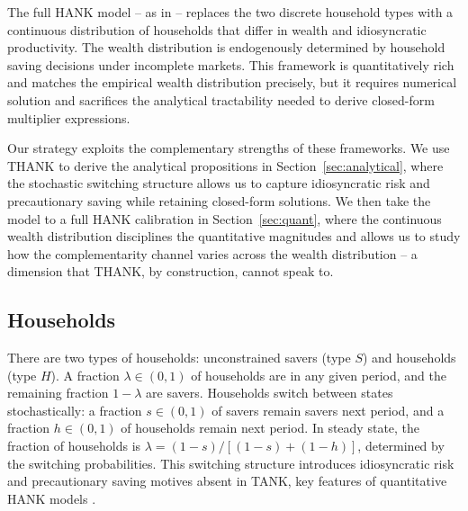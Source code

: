 The full HANK model -- as in \citet{KaplanMollViolante2018} -- replaces the two
discrete household types with a continuous distribution of households that
differ in wealth and idiosyncratic productivity. The wealth distribution is
endogenously determined by household saving decisions under incomplete markets.
This framework is quantitatively rich and matches the empirical wealth
distribution precisely, but it requires numerical solution and sacrifices the
analytical tractability needed to derive closed-form multiplier expressions.

Our strategy exploits the complementary strengths of these frameworks. We use
THANK to derive the analytical propositions in Section~\ref{sec:analytical},
where the stochastic switching structure allows us to capture idiosyncratic
risk and precautionary saving while retaining closed-form solutions. We then
take the model to a full HANK calibration in Section~\ref{sec:quant}, where the
continuous wealth distribution disciplines the quantitative magnitudes and
allows us to study how the complementarity channel varies across the wealth
distribution -- a dimension that THANK, by construction, cannot speak to.

\subsection{Households}\label{subsec:households}
There are two types of households: unconstrained savers (type $S$) and \HtM{}
households (type $H$). A fraction $\lambda\in(0,1)$ of households are \HtM{} in
any given period, and the remaining fraction $1-\lambda$ are savers. Households
switch between states stochastically: a fraction $s\in(0,1)$ of savers remain
savers next period, and a fraction $h\in(0,1)$ of \HtM{} households remain
\HtM{} next period. In steady state, the fraction of \HtM{} households is
$\lambda=(1-s)/[(1-s)+(1-h)]$, determined by the switching probabilities. This
switching structure introduces idiosyncratic risk and precautionary saving
motives absent in TANK, key features of quantitative HANK models
\citep{Bilbiie2025}.

